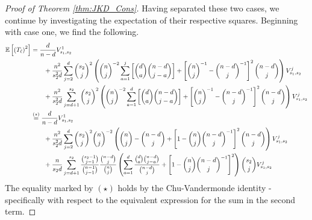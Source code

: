 \begin{proof}[Proof of Theorem \ref{thm:JKD_Cons}]
	Having separated these two cases, we continue by investigating the expectation
	of their respective squares. Beginning with case one, we find the following.
	\begin{equation}
		\begin{aligned}
			\mathbb{E}\left[\left(T_{\ell}\right)^2\right]
			 & = \frac{d}{n - d} V_{s_1, s_2}^{1}                                                                                                          \\
			 & \quad \quad + \frac{n^2}{s_2^2 d}\sum_{j = 2}^{d}\binom{s_2}{j}^2
			\left(\binom{n}{j}^{-2}\sum_{a = 1}^{j}\left[\binom{d}{a}\binom{n - d}{j - a}\right]
			+ \left[\binom{n}{j}^{-1} - \binom{n-d}{j}^{-1}\right]^{2} \binom{n - d}{j}\right)V_{s_1, s_2}^{j}                                             \\
			 & \quad \quad + \frac{n^2}{s_2^2 d}\sum_{j = d + 1}^{s_2}\binom{s_2}{j}^2
			\left(\binom{n}{j}^{-2}\sum_{a = 1}^{d}\left[\binom{d}{a}\binom{n - d}{j - a}\right]
			+ \left[\binom{n}{j}^{-1} - \binom{n-d}{j}^{-1}\right]^{2}\binom{n - d}{j}\right)V_{s_1, s_2}^{j}                                              \\
			 & \overset{(\star)}{=} \frac{d}{n - d} V_{s_1, s_2}^{1}                                                                                       \\
			 & \quad \quad + \frac{n^2}{s_2^2 d}\sum_{j = 2}^{d}\binom{s_2}{j}^2\binom{n}{j}^{-2}
			\left(\binom{n}{j} - \binom{n - d}{j}
			+ \left[1 - \binom{n}{j}\binom{n-d}{j}^{-1}\right]^{2}\binom{n - d}{j} \right)V_{s_1, s_2}^{j}                                                 \\
			 & \quad \quad + \frac{n}{s_2 d}\sum_{j = d + 1}^{s_2}\frac{\binom{s_2 - 1}{j - 1}}{\binom{n - 1}{j - 1}}\frac{\binom{n - d}{j}}{\binom{n}{j}}
			\left(\sum_{a = 1}^{d}\frac{\binom{d}{a}\binom{n - d}{j - a}}{\binom{n - d}{j}}
			+ \left[1 - \binom{n}{j}\binom{n-d}{j}^{-1}\right]^{2}\right)\binom{s_2}{j}V_{s_1, s_2}^{j}
		\end{aligned}
	\end{equation}
	The equality marked by $(\star)$ holds by the Chu-Vandermonde identity - specifically with respect to the equivalent expression for the sum in the second term.


\end{proof}
